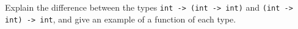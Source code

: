 Explain the difference between the types \lstinline{int -> (int -> int)} and \lstinline{(int -> int) -> int}, and give an example of a function of each type.
